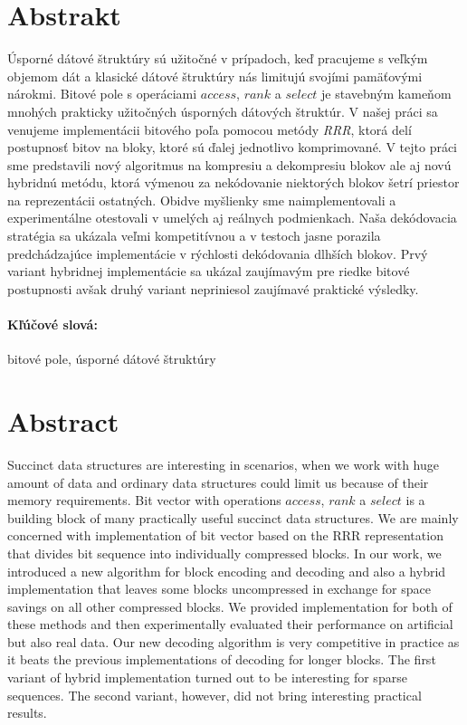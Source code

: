 \documentclass[12pt, twoside]{book}
\def\access{\mathit{access}}
\def\rank{\mathit{rank}}
\def\select{\mathit{select}}
\begin{document}
\section*{Abstrakt}  

Úsporné dátové štruktúry sú užitočné v prípadoch, keď pracujeme s veľkým
objemom dát a klasické dátové štruktúry nás limitujú svojími pamäťovými
nárokmi. Bitové pole s operáciami $\access$, $\rank$ a $\select$ je stavebným
kameňom mnohých prakticky užitočných úsporných dátových štruktúr. V našej práci
sa venujeme implementácii bitového poľa pomocou metódy \textit{RRR}, ktorá delí
postupnosť bitov na bloky, ktoré sú ďalej jednotlivo komprimované. V tejto práci
sme predstavili nový algoritmus na kompresiu a dekompresiu blokov ale aj novú
hybridnú metódu, ktorá výmenou za nekódovanie niektorých blokov šetrí priestor
na reprezentácii ostatných. Obidve myšlienky sme naimplementovali a experimentálne
otestovali v umelých aj reálnych podmienkach. Naša dekódovacia stratégia sa ukázala
veľmi kompetitívnou a v testoch jasne porazila predchádzajúce implementácie v
rýchlosti dekódovania dlhších blokov. Prvý variant hybridnej implementácie sa ukázal
zaujímavým pre riedke bitové postupnosti avšak druhý variant nepriniesol zaujímavé
praktické výsledky.

\paragraph*{Kľúčové slová:} bitové pole, úsporné dátové štruktúry


\newpage 
\section*{Abstract}

Succinct data structures are interesting in scenarios, when we work
with huge amount of data and ordinary data structures could limit us
because of their memory requirements. Bit vector with operations $\access$,
$\rank$ a $\select$ is a building block of many practically useful
succinct data structures. We are mainly concerned with implementation of
bit vector based on the RRR representation that divides bit sequence into
individually compressed blocks. In our work, we introduced a new algorithm
for block encoding and decoding and also a hybrid implementation that leaves
some blocks uncompressed in exchange for space savings on all other compressed
blocks. We provided implementation for both of these methods and then experimentally
evaluated their performance on artificial but also real data. Our new decoding algorithm
is very competitive in practice as it beats the previous implementations of decoding
for longer blocks. The first variant of hybrid implementation turned out to be interesting
for sparse sequences. The second variant, however, did not bring interesting practical
results.
\end{document}
